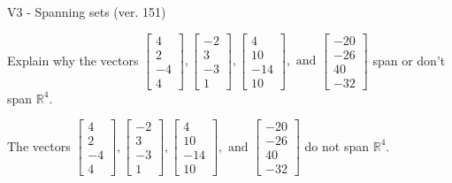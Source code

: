\begin{exercise}
  \begin{exerciseTitle}V3 - Spanning sets (ver. 151)\end{exerciseTitle}
  \begin{exerciseStatement}
    Explain why the vectors \(\left[\begin{array}{r}
4 \\
2 \\
-4 \\
4
\end{array}\right] , \left[\begin{array}{r}
-2 \\
3 \\
-3 \\
1
\end{array}\right] , \left[\begin{array}{r}
4 \\
10 \\
-14 \\
10
\end{array}\right] , \text{ and } \left[\begin{array}{r}
-20 \\
-26 \\
40 \\
-32
\end{array}\right]\) span or don't span \(\mathbb{R}^4\). 
	


  \end{exerciseStatement}
  \begin{exerciseAnswer}
   The vectors \(\left[\begin{array}{r}
4 \\
2 \\
-4 \\
4
\end{array}\right] , \left[\begin{array}{r}
-2 \\
3 \\
-3 \\
1
\end{array}\right] , \left[\begin{array}{r}
4 \\
10 \\
-14 \\
10
\end{array}\right] , \text{ and } \left[\begin{array}{r}
-20 \\
-26 \\
40 \\
-32
\end{array}\right]\) 
  	 do not  
	span \(\mathbb{R}^4\).
  


  \end{exerciseAnswer}
\end{exercise}